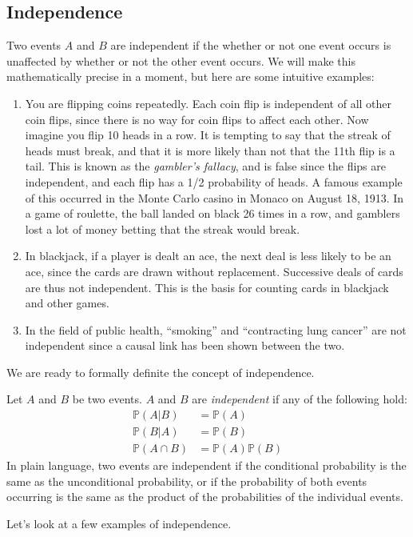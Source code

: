 \documentclass[12pt]{article}
\theoremstyle{definition}
\theoremstyle{remark}
\def\P{{\mathbb P}}
\begin{document}
\subsection{Independence}
Two events $A$ and $B$ are independent if the whether or not one event occurs is unaffected by whether or not the other event occurs. We will make this mathematically precise in a moment, but here are some intuitive examples:
\begin{enumerate}
\item You are flipping coins repeatedly. Each coin flip is independent of all other coin flips, since there is no way for coin flips to affect each other. Now imagine you flip 10 heads in a row. It is tempting to say that the streak of heads must break, and that it is more likely than not that the 11th flip is a tail. This is known as the \emph{gambler's fallacy}, and is false since the flips are independent, and each flip has a 1/2 probability of heads. A famous example of this occurred in the Monte Carlo casino in Monaco on August 18, 1913. In a game of roulette, the ball landed on black 26 times in a row, and gamblers lost a lot of money betting that the streak would break.
\item In blackjack, if a player is dealt an ace, the next deal is less likely to be an ace, since the cards are drawn without replacement. Successive deals of cards are thus not independent. This is the basis for counting cards in blackjack and other games.
\item In the field of public health, ``smoking'' and ``contracting lung cancer'' are not independent since a causal link has been shown between the two.
\end{enumerate}
We are ready to formally definite the concept of independence.

\begin{framed}
Let $A$ and $B$ be two events. $A$ and $B$ are \emph{independent} if any of the following hold:
\begin{align*}
\P(A|B) &= \P(A) \\
\P(B|A) &= \P(B) \\
\P(A \cap B) &= \P(A)\P(B)
\end{align*}
In plain language, two events are independent if the conditional probability is the same as the unconditional probability, or if the probability of both events occurring is the same as the product of the probabilities of the individual events.
\end{framed}

Let's look at a few examples of independence.
\end{document}
